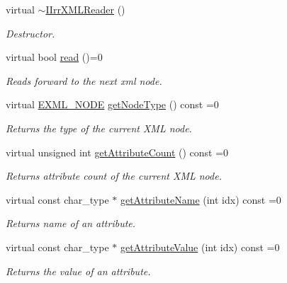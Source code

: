 \begin{DoxyCompactItemize}
\mbox{\label{classirr_1_1io_1_1IIrrXMLReader_ad1d9faeae926afc224d9dea0ad7a08ac}} 
virtual \hyperlink{classirr_1_1io_1_1IIrrXMLReader_ad1d9faeae926afc224d9dea0ad7a08ac}{$\sim$\+I\+Irr\+X\+M\+L\+Reader} ()
\begin{DoxyCompactList}\small\item\em Destructor. \end{DoxyCompactList}\item 
virtual bool \hyperlink{classirr_1_1io_1_1IIrrXMLReader_a157f458f7dabeeff173f72a0fb443a8e}{read} ()=0
\begin{DoxyCompactList}\small\item\em Reads forward to the next xml node. \end{DoxyCompactList}\item 
\mbox{\label{classirr_1_1io_1_1IIrrXMLReader_a3482e8e6bdc15965fc6a0bcef6e9a8e0}} 
virtual \hyperlink{namespaceirr_1_1io_a86a02676c9cbb822e04d60c81b4f33ed}{E\+X\+M\+L\+\_\+\+N\+O\+DE} \hyperlink{classirr_1_1io_1_1IIrrXMLReader_a3482e8e6bdc15965fc6a0bcef6e9a8e0}{get\+Node\+Type} () const =0
\begin{DoxyCompactList}\small\item\em Returns the type of the current X\+ML node. \end{DoxyCompactList}\item 
virtual unsigned int \hyperlink{classirr_1_1io_1_1IIrrXMLReader_a8f85253d2efb15061facdb9571b9c549}{get\+Attribute\+Count} () const =0
\begin{DoxyCompactList}\small\item\em Returns attribute count of the current X\+ML node. \end{DoxyCompactList}\item 
virtual const char\+\_\+type $\ast$ \hyperlink{classirr_1_1io_1_1IIrrXMLReader_aa0807dc565c67fcf355e656df1a326ef}{get\+Attribute\+Name} (int idx) const =0
\begin{DoxyCompactList}\small\item\em Returns name of an attribute. \end{DoxyCompactList}\item 
virtual const char\+\_\+type $\ast$ \hyperlink{classirr_1_1io_1_1IIrrXMLReader_a41bd71a1b9d4a80cd1d0257dedb35325}{get\+Attribute\+Value} (int idx) const =0
\begin{DoxyCompactList}\small\item\em Returns the value of an attribute. \end{DoxyCompactList}\item 

\end{DoxyCompactItemize}
